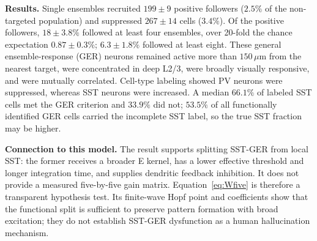 \documentclass[11pt]{article}
\begin{document}
\textbf{Results.}
Single ensembles recruited $199\pm9$ positive followers ($2.5\%$ of the
non-targeted population) and suppressed $267\pm14$ cells ($3.4\%$).  Of the
positive followers, $18\pm3.8\%$ followed at least four ensembles, over
20-fold the chance expectation $0.87\pm0.3\%$; $6.3\pm1.8\%$ followed at
least eight.  These general ensemble-response (GER) neurons remained active
more than $150\,\mu$m from the nearest target, were concentrated in deep
L2/3, were broadly visually responsive, and were mutually correlated.
Cell-type labeling showed PV neurons were suppressed, whereas SST neurons were
increased.  A median $66.1\%$ of labeled SST cells met the GER criterion and
$33.9\%$ did not; $53.5\%$ of all functionally identified GER cells carried
the incomplete SST label, so the true SST fraction may be higher.

\textbf{Connection to this model.}
The result supports splitting SST-GER from local SST: the former receives a
broader E kernel, has a lower effective threshold and longer integration time,
and supplies dendritic feedback inhibition.  It does not provide a measured
five-by-five gain matrix.  Equation~\eqref{eq:Wfive} is therefore a transparent
hypothesis test.  Its finite-wave Hopf point and coefficients show that the
functional split is sufficient to preserve pattern formation with broad
excitation; they do not establish SST-GER dysfunction as a human
hallucination mechanism.
\normalsize
\clearpage
\end{document}
